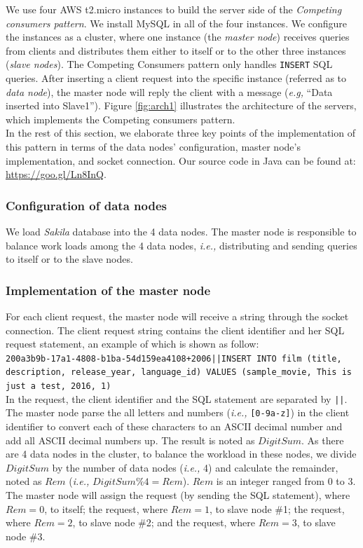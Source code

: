 \documentclass{article}
\begin{document}
We use four AWS t2.micro instances to build the server side of the \emph{Competing consumers pattern}. We install MySQL in all of the four instances. We configure the instances as a cluster, where one instance (the \emph{master node}) receives queries from clients and distributes them either to itself or to the other three instances (\emph{slave nodes}). The Competing Consumers pattern only handles \texttt{INSERT} SQL queries. After inserting a client request into the specific instance (referred as to \emph{data node}), the master node will reply the client with a message (\emph{e.g,} ``Data inserted into Slave1'').
Figure \ref{fig:arch1} illustrates the architecture of the servers, which implements the Competing consumers pattern.\\

In the rest of this section, we elaborate three key points of the implementation of this pattern in terms of the data nodes' configuration, master node's implementation, and socket connection. Our source code in Java can be found at: \url{https://goo.gl/Ln8InQ}.

\subsubsection{Configuration of data nodes}
We load \emph{Sakila} database into the 4 data nodes. The master node is responsible to balance work loads among the 4 data nodes, \emph{i.e.,} distributing and sending queries to itself or to the slave nodes.

\subsubsection{Implementation of the master node}\label{master-node}
For each client request, the master node will receive a string through the socket connection. The client request string contains the client identifier and her SQL request statement, an example of which is shown as follow:\\

\texttt{200a3b9b-17a1-4808-b1ba-54d159ea4108+2006||INSERT INTO film (title, description, release\_year, language\_id) VALUES (\textquotesingle sample\_movie\textquotesingle, \textquotesingle This is just a test\textquotesingle, 2016, 1)}\\

In the request, the client identifier and the SQL statement are separated by \texttt{||}. The master node parse the all letters and numbers (\emph{i.e.,} \texttt{[0-9a-z]}) in the client identifier to convert each of these characters to an ASCII decimal number and add all ASCII decimal numbers up. The result is noted as $DigitSum$. As there are 4 data nodes in the cluster, to balance the workload in these nodes, we divide $DigitSum$ by the number of data nodes (\emph{i.e.,} 4) and calculate the remainder, noted as $Rem$ (\emph{i.e.,} $DigitSum\%4=Rem$). $Rem$ is an integer ranged from 0 to 3. The master node will assign the request (by sending the SQL statement), where $Rem=0$, to itself; the request, where $Rem=1$, to slave node \#1; the request, where $Rem=2$, to slave node \#2; and the request, where $Rem=3$, to slave node \#3.\\
\end{document}
